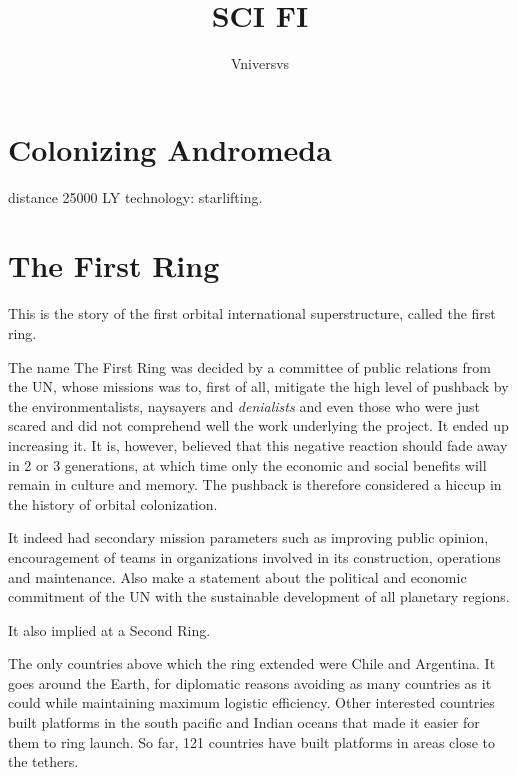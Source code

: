 \documentclass[]{article}
\title{SCI FI}
\author{Vniversvs}
\begin{document}
	
	\maketitle
	
	\begin{abstract}
		
	\end{abstract}
	
	\section{Colonizing Andromeda}
	
	distance 25000 LY
	technology: starlifting.
	
	\section{The First Ring}
	
	This is the story of the first orbital international superstructure, called the first ring. 
	
	The name The First Ring was decided by a committee of public relations from the UN, whose missions was to, first of all, mitigate the high level of pushback by the environmentalists, naysayers and \textit{denialists} and even those who were just scared and did not comprehend well the work underlying the project. It ended up increasing it. It is, however, believed that this negative reaction should fade away in 2 or 3 generations, at which time only the economic and social benefits will remain in culture and memory. The pushback is therefore considered a hiccup in the history of orbital colonization.
	
	It indeed had secondary mission parameters such as improving public opinion, encouragement of teams in organizations involved in its construction, operations and maintenance. Also make a statement about the political and economic commitment of the UN with the sustainable development of all planetary regions.
	
	It also implied at a Second Ring.
	
	The only countries above which the ring extended were Chile and Argentina. It goes around the Earth, for diplomatic reasons avoiding as many countries as it could while maintaining maximum logistic efficiency. Other interested countries built platforms in the south pacific and Indian oceans that made it easier for them to ring launch. So far, 121 countries have built platforms in areas close to the tethers.
	
\end{document}
